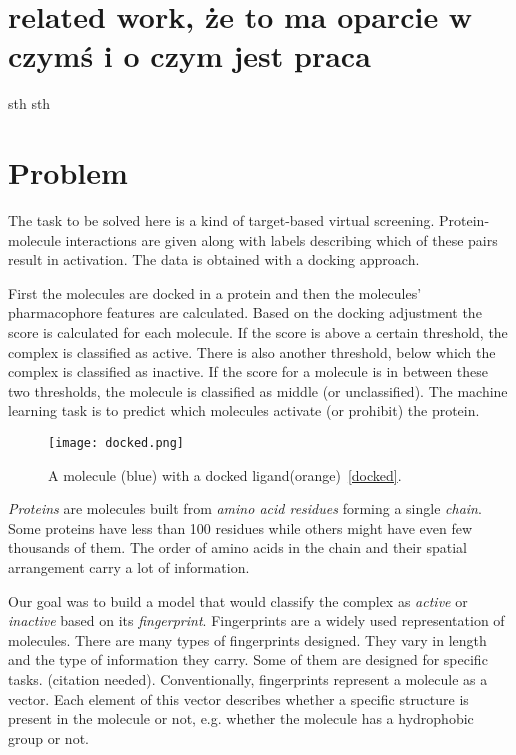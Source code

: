 \documentclass[a4paper,10pt]{report}
\begin{document}
    \section{related work, że to ma oparcie w czymś i o czym jest praca}
    sth sth %

    \section{Problem}\label{sec:PROBLEM}
    The task to be solved here is a kind of target-based virtual screening. Protein-molecule interactions are given along with labels describing which of these pairs result in activation. The data is obtained with a docking approach.
    
    First the molecules are docked in a protein and then the molecules' pharmacophore features are calculated. Based on the docking adjustment the score is calculated for each molecule. If the score is above a certain threshold, the complex is classified as active. There is also another threshold, below which the complex is classified as inactive. If the score for a molecule is in between these two thresholds, the molecule is classified as middle (or unclassified). The machine learning task is to predict which molecules activate (or prohibit) the protein.
    
    \begin{figure}[h!] %
	  \centering
	  \texttt{[image: docked.png]}
	  \caption{A molecule (blue) with a docked ligand(orange)~\ref{docked}.}
	  \label{PIC:docked}
    \end{figure} 
    
    \emph{Proteins} are molecules built from \emph{amino acid residues} forming a single \emph{chain}. Some proteins have less than 100 residues while others might have even few thousands of them. The order of amino acids in the chain and their spatial arrangement carry a lot of information. 
    
    Our goal was to build a model that would classify the complex as \emph{active} or \emph{inactive} based on its \emph{fingerprint}. Fingerprints are a widely used representation of molecules. There are many types of fingerprints designed. They vary in length and the type of information they carry. Some of them are designed for specific tasks. (citation needed). Conventionally, fingerprints represent a molecule as a vector. Each element of this vector describes whether a specific structure is present in the molecule or not, e.g. whether the molecule has a hydrophobic group or not. 
        
\end{document}
